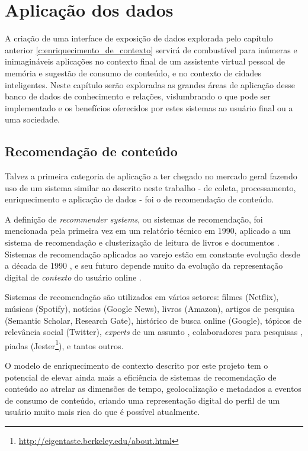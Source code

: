 \chapter{Aplicação dos dados}

A criação de uma interface de exposição de dados explorada pelo capítulo anterior \ref{c:enriquecimento_de_contexto} servirá de combustível para inúmeras e inimagináveis aplicações no contexto final de um assistente virtual pessoal de memória e sugestão de consumo de conteúdo, e no contexto de cidades inteligentes. Neste capítulo serão exploradas as grandes áreas de aplicação desse banco de dados de conhecimento e relações, vislumbrando o que pode ser implementado e os benefícios oferecidos por estes sistemas ao usuário final ou a uma sociedade.

\section{Recomendação de conteúdo}

Talvez a primeira categoria de aplicação a ter chegado no mercado geral fazendo uso de um sistema similar ao descrito neste trabalho - de coleta, processamento, enriquecimento e aplicação de dados - foi o de recomendação de conteúdo.

A definição de \textit{recommender systems}, ou sistemas de recomendação, foi mencionada pela primeira vez em um relatório técnico em 1990, aplicado a um sistema de recomendação e clusterização de leitura de livros e documentos \cite{Karlgren931533}. Sistemas de recomendação aplicados ao varejo estão em constante evolução desde a década de 1990 \cite{twodecades:amazon}, e seu futuro depende muito da evolução da representação digital de \textit{contexto} do usuário online \cite{evolution:recommender}.

Sistemas de recomendação são utilizados em vários setores: filmes (Netflix), músicas (Spotify), notícias (Google News), livros (Amazon), artigos de pesquisa (Semantic Scholar, Research Gate), histórico de busca online (Google), tópicos de relevância social (Twitter), \textit{experts} de um assunto \cite{expertseer}, colaboradores para pesquisas \cite{collabseer}, piadas (Jester\footnote{\url{http://eigentaste.berkeley.edu/about.html}}), e tantos outros.

O modelo de enriquecimento de contexto descrito por este projeto tem o potencial de elevar ainda mais a eficiência de sistemas de recomendação de conteúdo ao atrelar as dimensões de tempo, geolocalização e metadados a eventos de consumo de conteúdo, criando uma representação digital do perfil de um usuário muito mais rica do que é possível atualmente.

